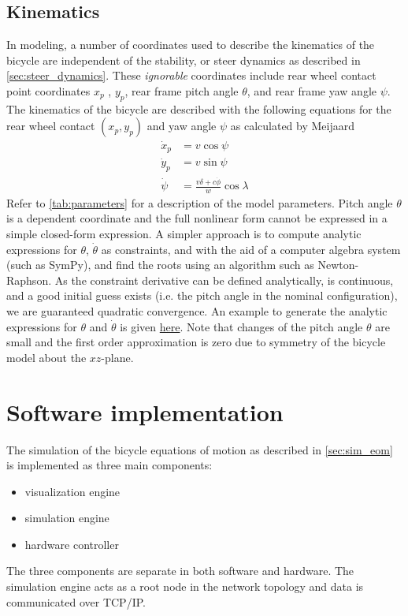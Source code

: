 \documentclass[11pt,a4paper,reqno]{amsart}
\newcommand{\x}{x_{p}}
\newcommand{\y}{y_{p}}
\newcommand{\pitch}{\theta}
\newcommand{\yaw}{\psi}
\newcommand{\steer}{\delta}
\newcommand{\dx}{\dot{x}_{p}}
\newcommand{\dy}{\dot{y}_{p}}
\newcommand{\pitchRate}{\dot{\theta}}
\newcommand{\yawRate}{\dot{\psi}}
\newcommand{\steerRate}{\dot{\phi}}
\begin{document}
\subsection{Kinematics}

In modeling, a number of coordinates used to describe the kinematics of the bicycle are independent of the stability, or
steer dynamics as described in \autoref{sec:steer_dynamics}.
These \textit{ignorable} coordinates include
rear wheel contact point coordinates $ x_p $ , $ y_p $,
rear frame pitch angle $ \pitch $, and rear frame yaw angle $ \yaw $.
The kinematics of the bicycle are described with the following equations for the rear wheel contact $ (\x, \y) $ and
yaw angle $ \yaw $ as calculated by Meijaard\cite{meijaard2007}
\begin{equation}
\begin{aligned}
    \dx &= v \cos{\yaw} \\
    \dy &= v \sin{\yaw} \\
    \yawRate &= \frac{v \steer + c \steerRate}{w} \cos{\lambda} \label{eq:kineq}
\end{aligned}
\end{equation}
Refer to \autoref{tab:parameters} for a description of the model parameters.
Pitch angle $ \pitch $ is a dependent coordinate and the full nonlinear form cannot be expressed in a simple closed-form
expression.
A simpler approach is to compute analytic expressions for $ \pitch $, $ \pitchRate $ as constraints, and with the aid of
a computer algebra system (such as SymPy\cite{sympy}), and find the roots using an algorithm such as Newton-Raphson.
As the constraint derivative can be defined analytically, is continuous, and a good initial guess exists (i.e. the pitch
angle in the nominal configuration), we are guaranteed quadratic convergence.
An example to generate the analytic expressions for $ \pitch$ and $ \pitchRate $ is given
\href{https://github.com/oliverlee/bicycle/blob/master/python/pitch_constraint.py}{here}.
Note that changes of the pitch angle $ \pitch $ are small and the first order approximation is zero due to symmetry of
the bicycle model about the $ xz $-plane.

\section{Software implementation}
The simulation of the bicycle equations of motion as described in \autoref{sec:sim_eom} is implemented as three main
components:
\begin{itemize}
    \item visualization engine
    \item simulation engine
    \item hardware controller
\end{itemize}
The three components are separate in both software and hardware.
The simulation engine acts as a root node in the network topology and data is communicated over TCP/IP.
\end{document}
